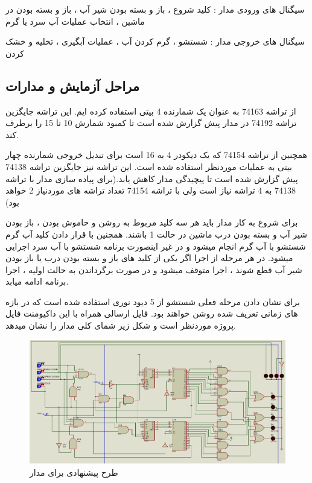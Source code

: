 \documentclass[twoside]{article}
\begin{document}
	سیگنال های ورودی مدار : کلید شروع ، باز و بسته بودن شیر آب ، باز و بسته بودن در ماشین ، انتخاب عملیات آب سرد یا گرم
	
	سیگنال های خروجی مدار : شستشو ، گرم کردن آب ، عملیات آبگیری ، تخلیه و خشک کردن
	
	
	
	\subsection*{مراحل آزمایش و مدارات}
	از تراشه 74163 به عنوان یک شمارنده 4 بیتی استفاده کرده ایم. این تراشه جایگزین تراشه 74192 در مدار پیش گزارش شده است تا کمبود شمارش 10 تا 15 را برطرف کند.
	
	همچنین از تراشه 74154 که یک دیکودر 4 به 16 است برای تبدیل خروجی شمارنده چهار بیتی به عملیات موردنظر استفاده شده است. این تراشه نیز جایگزین تراشه 74138 پیش گزارش شده است تا پیچیدگی مدار کاهش یابد.(برای پیاده سازی مدار با تراشه 74138 به 4 تراشه نیاز است ولی با تراشه 74154 تعداد تراشه های موردنیاز 2 خواهد بود) 
	
	برای شروع به کار مدار باید هر سه کلید مربوط به روشن و خاموش بودن ، باز بودن شیر آب و بسته بودن درب ماشین در حالت 1 باشند. همچنین با قرار دادن کلید آب گرم شستشو با آب گرم انجام میشود و در غیر اینصورت برنامه شستشو با آب سرد اجرایی میشود. 
	در هر مرحله از اجرا اگر یکی از کلید های باز و بسته بودن درب یا باز بودن شیر آب قطع شوند ، اجرا متوقف میشود و در صورت برگرداندن به حالت اولیه ، اجرا برنامه ادامه میابد.

	برای نشان دادن مرحله فعلی شستشو از 5 دیود نوری استفاده شده است که در بازه های زمانی تعریف شده روشن خواهند بود.
	فایل ارسالی همراه با این داکیومنت فایل پروژه موردنظر است و شکل زیر شمای کلی مدار را نشان میدهد.

	\begin{figure}[h!]
		\includegraphics[scale=0.50]{images/madar.png}
		\caption{طرح پیشنهادی برای مدار}

	\end{figure}
\end{document}
